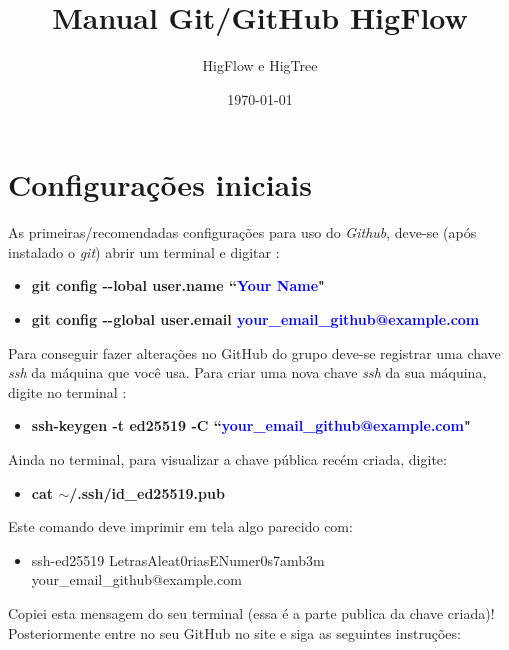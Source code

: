 \documentclass[12pt]{article}
\begin{document}
\title{Manual Git/GitHub HigFlow}
\author{HigFlow e HigTree}
\date{\today}
\maketitle

\section{Configurações iniciais}\label{sec:configuracoes}
As primeiras/recomendadas configurações para uso do \textit{Github}, deve-se (após instalado o \textit{git}) abrir um terminal e digitar \cite{site1}:
\begin{itemize}
	\item \textbf{git config  -\hspace{0.5mm}-lobal user.name ``\textcolor{blue}{Your Name}"}
	\item \textbf{git config -\hspace{0.5mm}-global user.email \textcolor{blue}{your\_email\_github@example.com}}
\end{itemize}

Para conseguir fazer alterações no GitHub do grupo deve-se registrar uma chave \textit{ssh} da máquina que você usa. Para criar uma nova chave \textit{ssh} da sua máquina, digite no terminal \cite{site2}:
\begin{itemize}
	\item \textbf{ssh-keygen -t ed25519 -C ``\textcolor{blue}{your\_email\_github@example.com}"}
\end{itemize}
Ainda no terminal, para visualizar a chave pública recém criada, digite:
\begin{itemize}
	\item \textbf{cat $\sim$/.ssh/id\_ed25519.pub}
\end{itemize}
Este comando deve imprimir em tela algo parecido com:
\begin{itemize}
	\item[] ssh-ed25519 LetrasAleat0riasENumer0s7amb3m your\_email\_github@example.com
\end{itemize}
Copiei esta mensagem do seu terminal (essa é a parte publica da chave criada)! Posteriormente entre no seu GitHub no site e siga as seguintes instruções:
\end{document}
